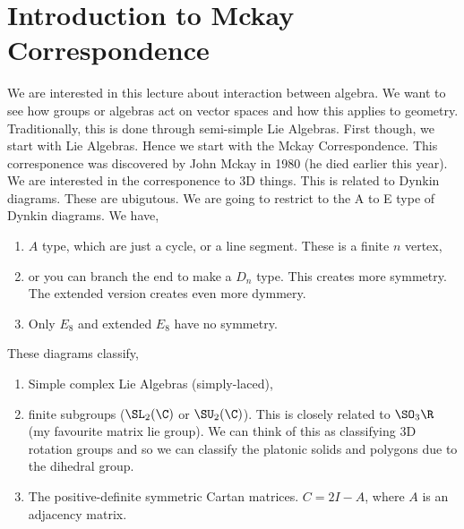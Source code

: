 
\section{Introduction to Mckay Correspondence}
We are interested in this lecture about interaction between algebra. We want to see how groups or algebras act on vector spaces and how this applies to geometry. Traditionally, this is done through semi-simple Lie Algebras. First though, we start with Lie Algebras. Hence we start with the Mckay Correspondence. This corresponence was discovered by John Mckay in 1980 (he died earlier this year). We are interested in the corresponence to 3D things. This is related to Dynkin diagrams. These are ubigutous. We are going to restrict to the A to E type of Dynkin diagrams. We have,
\begin{enumerate}
  \item $A$ type, which are just a cycle, or a line segment. These is a finite $n$ vertex,
  \item or you can branch the end to make a $D_n$ type. This creates more symmetry. The extended version creates even more dymmery.
  \item Only $E_8$ and extended $E_8$ have no symmetry.
\end{enumerate}
 These diagrams classify,
\begin{enumerate}
  \item Simple complex Lie Algebras (simply-laced),
  \item finite subgroups ($\SL_2(\C)$ or $\SU_2(\C)$). This is closely related to $\SO_3\R$ (my favourite matrix lie group). We can think of this as classifying 3D rotation groups and so we can classify the platonic solids and polygons due to the dihedral group.
  \item The positive-definite symmetric Cartan matrices. $C = 2I - A$, where $A$ is an adjacency matrix.
\end{enumerate}

